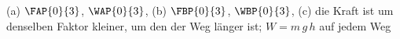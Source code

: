 (a) $\FAP{0}{3}$, $\WAP{0}{3}$, (b) $\FBP{0}{3}$, $\WBP{0}{3}$, (c) die Kraft ist um denselben Faktor kleiner, um den der Weg länger ist; $W = m\,g\,h$ auf jedem Weg
